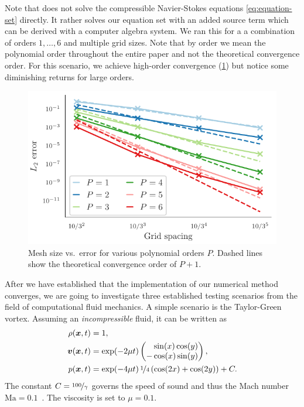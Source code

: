 \documentclass[runningheads]{llncs}
\newcommand{\Qrho}{\rho}
\newcommand{\Qv}{\bm{v}}
\newcommand{\pressure}{p}
\begin{document}
Note that  does not solve the compressible Navier-Stokes equations \cref{eq:equation-set} directly.
It rather solves our equation set with an added source term which can be derived with a computer algebra system.
We ran this for a a combination of orders $1, \ldots, 6$ and multiple grid sizes.
Note that by order we mean the polynomial order throughout the entire paper and not the theoretical convergence order.
For this scenario, we achieve high-order convergence (\cref{fig:convergence-test}) but notice some diminishing returns for large orders.
\begin{figure}[tb]
  \centering
  \includegraphics{CP032_fig1}
  \caption{\label{fig:convergence-test}Mesh size vs.\ error for various polynomial orders $P$.
    Dashed lines show the theoretical convergence order of $P+1$.}
\end{figure}

After we have established that the implementation of our numerical method converges, we are going to investigate three established testing scenarios from the field of computational fluid mechanics.
A simple scenario is the Taylor-Green vortex.
Assuming an \textit{incompressible} fluid, it can be written as
\begin{align}
  \label{eq:taylor-green}
  \begin{split}
  \Qrho(\bm{x}, t) &= 1,\\
  \Qv(\bm{x}, t) &= \exp(-2 \mu t)
  \begin{pmatrix}
    \phantom{-}\sin(x) \cos(y) \\
- \cos(x) \sin(y) 
    \end{pmatrix}, \\
  \pressure(\bm{x}, t) &= \exp(-4 \mu t) \, \nicefrac{1}{4} \left( \cos(2x) + \cos(2y) \right) + C.
  \end{split}
\end{align}
The constant $C = \nicefrac{100}{\gamma}$ governs the speed of sound and thus the Mach number $\text{Ma} = 0.1$~\cite{dumbser2016high}.
The viscosity is set to $\mu = 0.1$. 
\end{document}
